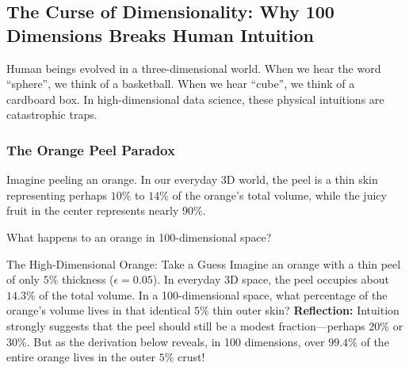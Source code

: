 \subsection{The Curse of Dimensionality: Why 100 Dimensions Breaks Human Intuition}
Human beings evolved in a three-dimensional world. When we hear the word ``sphere'', we think of a basketball. When we hear ``cube'', we think of a cardboard box. In high-dimensional data science, these physical intuitions are catastrophic traps.

\subsubsection{The Orange Peel Paradox}
Imagine peeling an orange. In our everyday 3D world, the peel is a thin skin representing perhaps $10\%$ to $14\%$ of the orange's total volume, while the juicy fruit in the center represents nearly $90\%$.

What happens to an orange in 100-dimensional space?

\begin{ponderbox}{The High-Dimensional Orange: Take a Guess}
Imagine an orange with a thin peel of only $5\%$ thickness ($\epsilon = 0.05$). In everyday 3D space, the peel occupies about $14.3\%$ of the total volume. In a 100-dimensional space, what percentage of the orange's volume lives in that identical $5\%$ thin outer skin?
\tcblower
\textbf{Reflection:} Intuition strongly suggests that the peel should still be a modest fraction—perhaps $20\%$ or $30\%$. But as the derivation below reveals, in 100 dimensions, over $99.4\%$ of the entire orange lives in the outer $5\%$ crust!
\end{ponderbox}

